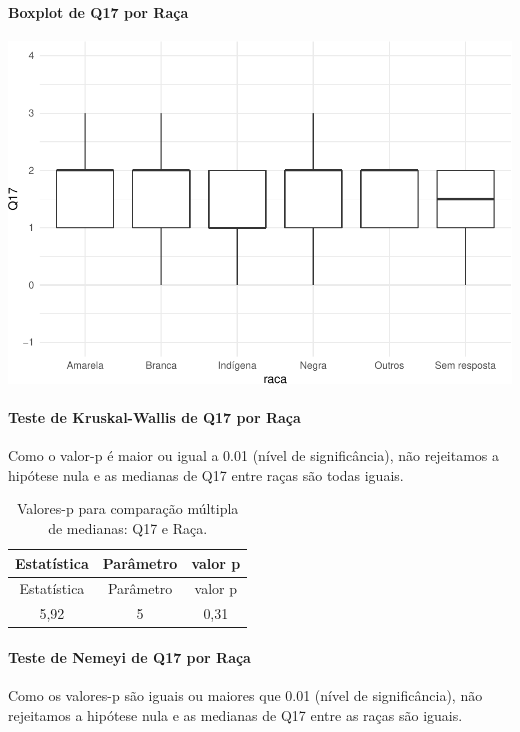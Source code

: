 \documentclass[]{article}
\let\oldparagraph\paragraph
\renewcommand{\paragraph}[1]{\oldparagraph{#1}\mbox{}}
\begin{document}
\hypertarget{boxplot-de-q17-por-rauxe7a}{%
\paragraph{Boxplot de Q17 por Raça}\label{boxplot-de-q17-por-rauxe7a}}

\begin{center}\includegraphics[width=0.75\linewidth]{relatorio_covid19_files/figure-latex/unnamed-chunk-224-1} \end{center}

\hypertarget{teste-de-kruskal-wallis-de-q17-por-rauxe7a}{%
\paragraph{Teste de Kruskal-Wallis de Q17 por Raça}\label{teste-de-kruskal-wallis-de-q17-por-rauxe7a}}

Como o valor-p é maior ou igual a 0.01 (nível de significância), não rejeitamos a hipótese nula e as medianas de Q17 entre raças são todas iguais.

\begin{longtable}[]{@{}ccc@{}}
\caption{\label{tab:unnamed-chunk-226}Valores-p para comparação múltipla de medianas: Q17 e Raça.}\tabularnewline
\toprule
Estatística & Parâmetro & valor p\tabularnewline
\midrule
\endfirsthead
\toprule
Estatística & Parâmetro & valor p\tabularnewline
\midrule
\endhead
5,92 & 5 & 0,31\tabularnewline
\bottomrule
\end{longtable}

\hypertarget{teste-de-nemeyi-de-q17-por-rauxe7a}{%
\paragraph{Teste de Nemeyi de Q17 por Raça}\label{teste-de-nemeyi-de-q17-por-rauxe7a}}

Como os valores-p são iguais ou maiores que 0.01 (nível de significância), não rejeitamos a hipótese nula e as medianas de Q17 entre as raças são iguais.
\end{document}
